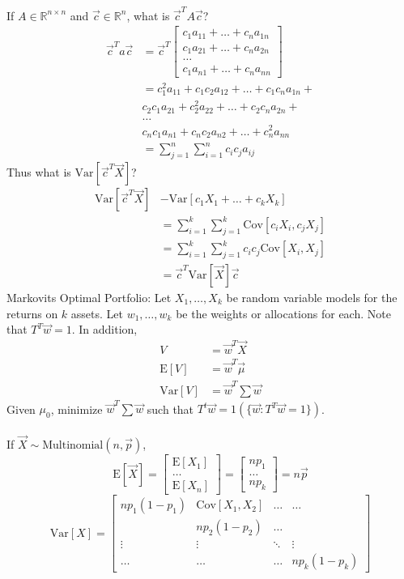 \documentclass[12pt]{article}
\newcommand{\set}[1]{\Big\{ #1 \Big\}}
\newcommand{\expected}[1]{\mathrm{E}[#1]}
\newcommand{\variance}[1]{\mathrm{Var}[#1]}
\newcommand{\covariance}[1]{\mathrm{Cov}[#1]}
\begin{document}
If $A \in \mathbb{R}^{n \times n}$ and $\vec{c} \in \mathbb{R}^n$, what is $\vec{c}^T A\vec{c}$? $$\begin{aligned} \vec{c}^Ta\vec{c} &= \vec{c}^T \begin{bmatrix} c_1a_{11} + \dots + c_na_{1n} \\ c_1a_{21} + \dots + c_na_{2n} \\ \hdots \\ c_1a_{n1} + \dots + c_na_{nn} \end{bmatrix} \\ &= c_1^2a_{11} + c_1c_2a_{12} + \dots + c_1c_na_{1n} + \\
& c_2c_1a_{21} + c_2^2a_{22} + \dots + c_2c_na_{2n} + \\ &\hdots \\ &c_nc_1a_{n1} + c_nc_2a_{n2} + \dots + c_n^2a_{nn} \\ &= \sum_{j = 1}^n \sum_{i = 1}^n c_ic_ja_{ij} \end{aligned} $$ 
Thus what is $\variance{\vec{c}^T\vec{X}}$? $$\begin{aligned} \variance{\vec{c}^T\vec{X}} &- \variance{c_1X_1 + \dots + c_kX_k} \\ &= \sum_{i = 1}^k \sum_{j = 1}^k \covariance{c_iX_i, c_jX_j} \\ &= \sum_{i = 1}^k \sum_{j = 1}^k c_ic_j \covariance{X_i, X_j} \\ &= \vec{c}^T \variance{\vec{X}}\vec{c} \end{aligned} $$ 
Markovits Optimal Portfolio: Let $X_1, \dots, X_k$ be random variable models for the returns on $k$ assets. Let $w_1, \dots, w_k$ be the weights or allocations for each. Note that $T^T\vec{w} = 1$. In addition, $$\begin{aligned} V &= \vec{w}^T\vec{X} \\ \expected{V} &= \vec{w}^T\vec{\mu} \\ \variance{V} &= \vec{w}^T\sum \vec{w} \end{aligned} $$ 
Given $\mu_0$, minimize $\vec{w}^T \sum \vec{w}$ such that $T^t\vec{w} = 1 (\set{\vec{w}: T^T\vec{w} = 1})$. \\~\\
If $\vec{X} \sim \text{Multinomial}(n, \vec{p})$, $$\expected{\vec{X}} = \begin{bmatrix} \expected{X_1} \\ \hdots \\ \expected{X_n} \end{bmatrix} = \begin{bmatrix} np_1 \\ \hdots \\ np_k \end{bmatrix} = n\vec{p} $$ $$\variance{X} = \begin{bmatrix} np_1(1 - p_1) & \covariance{X_1, X_2} & \ldots & \ldots \\ & np_2(1 - p_2) & \ldots  & \\ \vdots & \vdots & \ddots & \vdots \\ \ldots & \ldots & \ldots & np_k(1 - p_k) \end{bmatrix} $$
\end{document}
